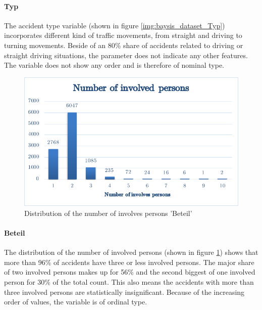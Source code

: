 \documentclass[a4paper,12pt]{report}
\begin{document}
\paragraph{Typ}
The accident type variable (shown in figure \ref{img:baysis_dataset_Typ}) incorporates different kind of traffic movements, from straight and driving to turning movements. Beside of an 80\% share of accidents related to driving or straight driving situations, the parameter does not indicate any other features. The variable does not show any order and is therefore of nominal type.

\begin{figure}[H]
	\centering
	\includegraphics[scale=0.6]{./assets/baysis_dataset_Beteil.pdf}
	\caption{Distribution of the number of involves persons 'Beteil'}
	\label{img:baysis_dataset_Beteil}
\end{figure}

\paragraph{Beteil}
The distribution of the number of involved persons (shown in figure \ref{img:baysis_dataset_Beteil}) shows that more than 96\% of accidents have three or less involved persons. The major share of two involved persons makes up for 56\% and the second biggest of one involved person for 30\% of the total count. This also means the accidents with more than three involved persons are statistically insignificant. Because of the increasing order of values, the variable is of ordinal type.
\end{document}
